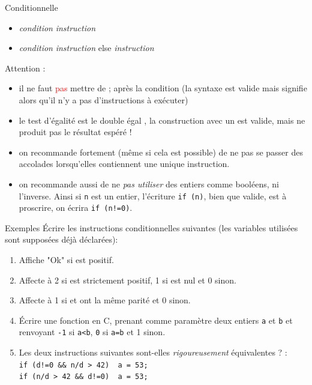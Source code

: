 \documentclass[10pt]{beamer}
\begin{document}
\begin{frame}[fragile]{\Ctitle}{\stitle}
	\begin{alertblock}{Conditionnelle}
		\begin{itemize}
			\item<1->  \kw{(}\textit{condition}\kw{)}  \kw{\{} \textit{instruction} \kw{\}}
			\item<2->  \kw{(}\textit{condition}\kw{)}  \kw{\{} \textit{instruction} \kw{\}} else \kw{\{} \textit{instruction} \kw{\}}
		\end{itemize}
	 \textcolor{BrickRed}{\small \danger} Attention :
	\begin{itemize}
		\item<4-> il ne faut \textcolor{red}{\sc pas} mettre de {\kw ;} après la condition (la syntaxe est valide mais signifie alors qu'il n'y a pas d'instructions à exécuter)
		\item<5-> le test d'égalité est le double égal \kw{==}, la construction avec un \kw{=} est valide, mais ne produit pas le résultat espéré !
		\item<6-> on recommande fortement (même si cela est possible) de ne pas se passer des accolades lorsqu'elles contiennent une unique instruction.
		\item<7-> on recommande aussi de ne \textit{pas utiliser} des entiers comme booléens, ni l'inverse. Ainsi si {\tt n} est un entier, l'écriture \texttt{if (n)}, bien que valide, est à proscrire, on écrira \texttt{if (n!=0)}.
	\end{itemize}
	 
	\end{alertblock}
\end{frame}

\begin{frame}[fragile]{\Ctitle}{\stitle}
	\begin{exampleblock}{Exemples}
		Écrire les instructions conditionnelles suivantes (les variables utilisées sont supposées déjà déclarées):
		\begin{enumerate}
			\item<1-> Affiche "Ok" si  est positif.
			\item<2-> Affecte  à 2 si  est strictement positif, 1 si  est nul et 0 sinon.
			\item<3-> Affecte  à 1 si  et  ont la même parité et 0 sinon.
			\item<4->{Écrire une fonction  en C, prenant comme paramètre deux entiers {\tt a} et {\tt b} et renvoyant {\tt -1} si {\tt a<b}, {\tt 0} si {\tt a=b} et 1 sinon.}
			\item<5-> Les deux instructions suivantes sont-elles \textit{rigoureusement} équivalentes ? : \\
			\texttt{if (d!=0 && n/d > 42) { a = 53;}} \\
			\texttt{if (n/d > 42 && d!=0) { a = 53;}} \\
		\end{enumerate}
	\end{exampleblock}
\end{frame}
\end{document}
